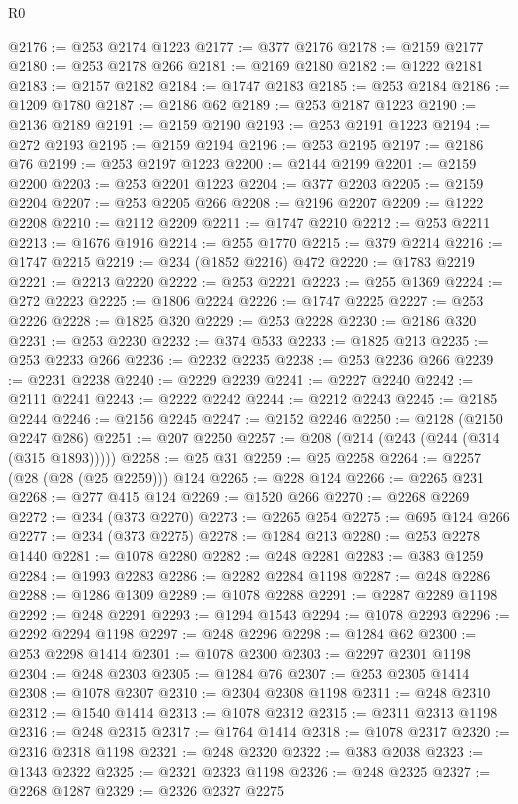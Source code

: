 \begin{lexlean}{R0}
\begin{coremodule}
@2176 := @253 @2174 @1223
@2177 := @377 @2176
@2178 := @2159 @2177
@2180 := @253 @2178 @266
@2181 := @2169 @2180
@2182 := @1222 @2181
@2183 := @2157 @2182
@2184 := @1747 @2183
@2185 := @253 @2184
@2186 := @1209 @1780
@2187 := @2186 @62
@2189 := @253 @2187 @1223
@2190 := @2136 @2189
@2191 := @2159 @2190
@2193 := @253 @2191 @1223
@2194 := @272 @2193
@2195 := @2159 @2194
@2196 := @253 @2195
@2197 := @2186 @76
@2199 := @253 @2197 @1223
@2200 := @2144 @2199
@2201 := @2159 @2200
@2203 := @253 @2201 @1223
@2204 := @377 @2203
@2205 := @2159 @2204
@2207 := @253 @2205 @266
@2208 := @2196 @2207
@2209 := @1222 @2208
@2210 := @2112 @2209
@2211 := @1747 @2210
@2212 := @253 @2211
@2213 := @1676 @1916
@2214 := @255 @1770
@2215 := @379 @2214
@2216 := @1747 @2215
@2219 := @234 (@1852 @2216) @472
@2220 := @1783 @2219
@2221 := @2213 @2220
@2222 := @253 @2221
@2223 := @255 @1369
@2224 := @272 @2223
@2225 := @1806 @2224
@2226 := @1747 @2225
@2227 := @253 @2226
@2228 := @1825 @320
@2229 := @253 @2228
@2230 := @2186 @320
@2231 := @253 @2230
@2232 := @374 @533
@2233 := @1825 @213
@2235 := @253 @2233 @266
@2236 := @2232 @2235
@2238 := @253 @2236 @266
@2239 := @2231 @2238
@2240 := @2229 @2239
@2241 := @2227 @2240
@2242 := @2111 @2241
@2243 := @2222 @2242
@2244 := @2212 @2243
@2245 := @2185 @2244
@2246 := @2156 @2245
@2247 := @2152 @2246
@2250 := @2128 (@2150 @2247 @286)
@2251 := @207 @2250
@2257 := @208 (@214 (@243 (@244 (@314 (@315 @1893)))))
@2258 := @25 @31
@2259 := @25 @2258
@2264 := @2257 (@28 (@28 (@25 @2259))) @124
@2265 := @228 @124
@2266 := @2265 @231
@2268 := @277 @415 @124
@2269 := @1520 @266
@2270 := @2268 @2269
@2272 := @234 (@373 @2270)
@2273 := @2265 @254
@2275 := @695 @124 @266
@2277 := @234 (@373 @2275)
@2278 := @1284 @213
@2280 := @253 @2278 @1440
@2281 := @1078 @2280
@2282 := @248 @2281
@2283 := @383 @1259
@2284 := @1993 @2283
@2286 := @2282 @2284 @1198
@2287 := @248 @2286
@2288 := @1286 @1309
@2289 := @1078 @2288
@2291 := @2287 @2289 @1198
@2292 := @248 @2291
@2293 := @1294 @1543
@2294 := @1078 @2293
@2296 := @2292 @2294 @1198
@2297 := @248 @2296
@2298 := @1284 @62
@2300 := @253 @2298 @1414
@2301 := @1078 @2300
@2303 := @2297 @2301 @1198
@2304 := @248 @2303
@2305 := @1284 @76
@2307 := @253 @2305 @1414
@2308 := @1078 @2307
@2310 := @2304 @2308 @1198
@2311 := @248 @2310
@2312 := @1540 @1414
@2313 := @1078 @2312
@2315 := @2311 @2313 @1198
@2316 := @248 @2315
@2317 := @1764 @1414
@2318 := @1078 @2317
@2320 := @2316 @2318 @1198
@2321 := @248 @2320
@2322 := @383 @2038
@2323 := @1343 @2322
@2325 := @2321 @2323 @1198
@2326 := @248 @2325
@2327 := @2268 @1287
@2329 := @2326 @2327 @2275

\end{coremodule}
\end{lexlean}
